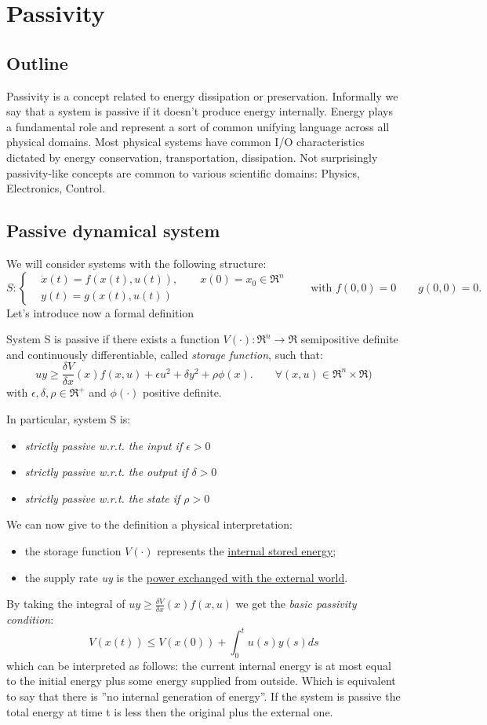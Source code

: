 \chapter{Passivity}
\section{Outline}
Passivity is a concept related to energy dissipation or preservation. Informally we say that a system is passive if it doesn't produce energy internally. Energy plays a fundamental role and represent a sort of common unifying language across all physical domains. Most physical systems have common I/O characteristics dictated by energy conservation, transportation, dissipation.
Not surprisingly passivity-like concepts are common to various scientific domains: Physics, Electronics, Control.
\section{Passive dynamical system}
We will consider systems with the following structure:
\[
S:\begin{cases}
	&\dot{x}(t)=f(x(t),u(t)), \qquad x(0)=x_0 \in \Re^n\\
	&y(t)=g(x(t),u(t))
\end{cases}\qquad
\text{with }f(0,0)=0 \qquad g(0,0)=0.
\]
Let's introduce now a formal definition
\begin{defn}
	System S is passive if there exists a function $V(\cdot)\colon\Re^n\to\Re$ semipositive definite and continuously differentiable, called \emph{storage function}, such that:
	\[
	uy\ge\frac{\delta V}{\delta x}(x)f(x,u)+\epsilon u^2+\delta y^2+\rho\phi(x).\qquad \forall(x,u)\in \Re^n\times\Re)
	\]with $\epsilon,\delta,\rho\in\Re^+$ and $\phi(\cdot)$ positive definite.
\end{defn}
In particular, system S is:
\begin{itemize}
	\item \emph{strictly passive w.r.t. the input if $\epsilon >0$}
	\item \emph{strictly passive w.r.t. the output if $\delta >0$}
	\item \emph{strictly passive w.r.t. the state if $\rho >0$} 
\end{itemize}
We can now give to the definition a physical interpretation:
\begin{itemize}
	\item the storage function $V(\cdot)$ represents the \underline{internal stored energy};
	\item the supply rate \emph{uy} is the \underline{power exchanged with the external world}.
\end{itemize}
By taking the integral of $uy\ge\frac{\delta V}{\delta x}(x)f(x,u)$ we get the \emph{basic passivity condition}:
\[
V(x(t))\le V(x(0))+\int_{0}^{t}u(s)y(s)ds
\]which can be interpreted as follows: the current internal energy is at most equal to the initial energy plus some energy supplied from outside. Which is equivalent to say that there is ''no internal generation of energy''. If the system is passive the total energy at time t is less then the original plus the external one.
